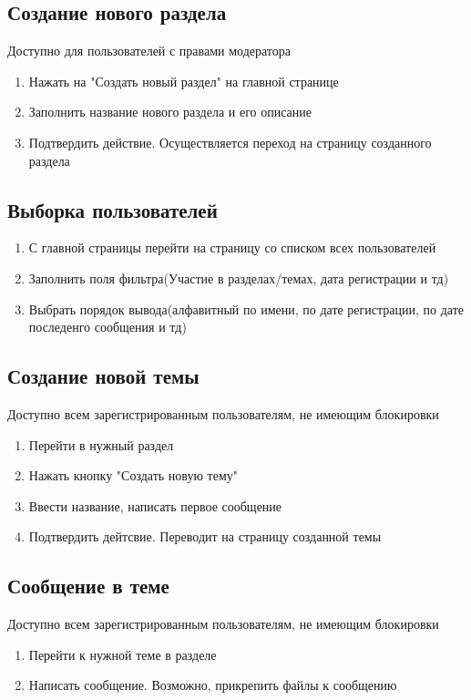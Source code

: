 \documentclass[a4paper, 12pt]{article}
\begin{document}
	\subsection{Создание нового раздела}
		Доступно для пользователей с правами модератора
		\begin{enumerate}
			\item Нажать на "Создать новый раздел" на главной странице
			\item Заполнить название нового раздела и его описание
			\item Подтвердить действие. Осуществляется переход на страницу созданного раздела
		\end{enumerate}
		
	\subsection{Выборка пользователей}
		\begin{enumerate}
			\item С главной страницы перейти на страницу со списком всех пользователей
			\item Заполнить поля фильтра(Участие в разделах/темах, дата регистрации и тд)
			\item Выбрать порядок вывода(алфавитный по имени, по дате регистрации, по дате последенго сообщения и тд)
		\end{enumerate}
		
	\subsection{Создание новой темы}
		Доступно всем зарегистрированным пользователям, не имеющим блокировки
		\begin{enumerate}
			\item Перейти в нужный раздел
			\item Нажать кнопку "Создать новую тему"
			\item Ввести название, написать первое сообщение
			\item Подтвердить дейтсвие. Переводит на страницу созданной темы
		\end{enumerate}
		
	\subsection{Сообщение в теме}
		Доступно всем зарегистрированным пользователям, не имеющим блокировки
		\begin{enumerate}
			\item Перейти к нужной теме в разделе
			\item Написать сообщение. Возможно, прикрепить файлы к сообщению
		\end{enumerate}
		
\end{document}
